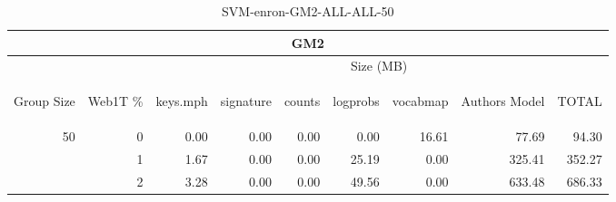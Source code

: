 \begin{center}
\begin{table}[htbp] 
 \begin{center}
\begin{tabular}{ | r | r | r | r | r | r | r | r | r |}
\hline
\multicolumn{9}{|c|}{GM2}\\
\hline
 & & \multicolumn{7}{|c|}{Size (MB)}\\ \cline{3-9}
\begin{sideways}Group Size\end{sideways} & \begin{sideways}Web1T \% \end{sideways} & \begin{sideways}keys.mph\end{sideways} & \begin{sideways}signature\end{sideways} & \begin{sideways}counts\end{sideways} & \begin{sideways}logprobs\end{sideways} & \begin{sideways}vocabmap\end{sideways} & \begin{sideways}Authors Model \end{sideways} & \begin{sideways}TOTAL\end{sideways}\\
\hline
\multirow{2}{*}{50}
 & 0 & 0.00 & 0.00 & 0.00 & 0.00 & 16.61 & 77.69 & 94.30\\ \cline{2-9}
 & 1 & 1.67 & 0.00 & 0.00 & 25.19 & 0.00 & 325.41 & 352.27\\ \cline{2-9}
 & 2 & 3.28 & 0.00 & 0.00 & 49.56 & 0.00 & 633.48 & 686.33\\ \cline{2-9}
\hline
\end{tabular}
\caption{SVM-enron-GM2-ALL-ALL-50}
\label{table:SVM-enron-GM2-ALL-ALL-50}
\end{center}
 \end{table}
\end{center}

